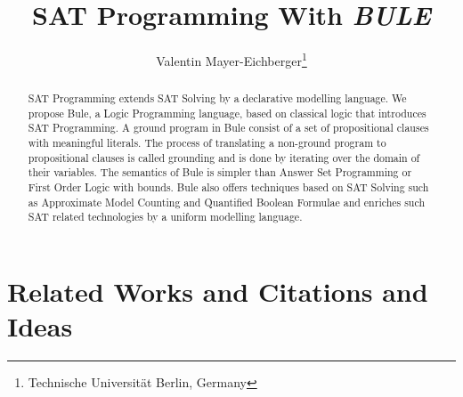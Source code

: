 \documentclass{new_tlp}
\title{ SAT Programming With \emph{BULE}}
\author{
    Valentin Mayer-Eichberger\footnote{Technische Universit\"at Berlin, Germany} 
}
\begin{document}
\maketitle


\begin{abstract}
    SAT Programming extends SAT Solving by a declarative modelling language. 
    We propose Bule, a Logic Programming language, based on classical logic that introduces SAT Programming. 
    A ground program in Bule consist of a set of propositional clauses with meaningful literals. 
    The process of translating a non-ground program to propositional clauses is called grounding and is done by iterating over the domain of their variables. 
    The semantics of Bule is simpler than Answer Set Programming or First Order Logic with bounds.  
    Bule also offers techniques based on SAT Solving such as Approximate Model Counting and Quantified Boolean Formulae 
    and enriches such SAT related technologies by a uniform modelling language. 





\end{abstract}

\section{Related Works and Citations and Ideas}
\end{document}

